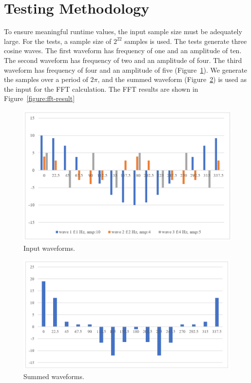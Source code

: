 \documentclass{amsart}
\begin{document}
\section{Testing Methodology}
To ensure meaningful runtime values, the input sample size must be adequately large. For the tests, a sample size of $2^{22}$ samples is used. The tests generate three cosine waves. The first waveform has frequency of one and an amplitude of ten. The second waveform has frequency of two and an amplitude of four. The third waveform has frequency of four and an amplitude of five (Figure~\ref{figure:input-waveforms}). We generate the samples over a period of $2\pi$, and the summed waveform (Figure~\ref{figure:summed-waveform}) is used as the input for the FFT calculation. The FFT results are shown in Figure~\ref{figure:fft-result}

\begin{figure}[htbp]
\caption{Input waveforms.}
\begin{center}
\includegraphics{input-waveforms.PNG}
\end{center}
\label{figure:input-waveforms}
\end{figure}

\begin{figure}[H]
\caption{Summed waveforms.}
\begin{center}
\includegraphics{summed-waveform.PNG}
\end{center}
\label{figure:summed-waveform}
\end{figure}
\end{document}
